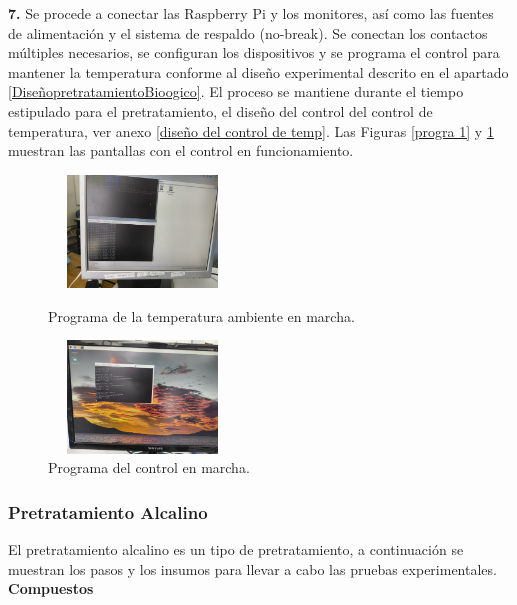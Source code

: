\documentclass[12pt]{article}
\begin{document}
			
			\textbf{7. } Se procede a conectar las Raspberry Pi y los monitores, así como las fuentes de alimentación y el sistema de respaldo (no-break). Se conectan los contactos múltiples necesarios, se configuran los dispositivos y se programa el control para mantener la temperatura conforme al diseño experimental descrito en el apartado \ref{DiseñopretratamientoBioogico}. El proceso se mantiene durante el tiempo estipulado para el pretratamiento, el diseño del control del control de temperatura, ver anexo \ref{diseño del control de temp}. Las Figuras \ref{progra 1} y \ref{progra 2} muestran las pantallas con el control en funcionamiento.
			
			\begin{figure}[H]
				\centering
				\begin{minipage}{0.46\textwidth}
					\centering
					\includegraphics[width=5cm, height=3cm]{imagenes/programa1} %
					\caption{Programa de la temperatura ambiente en marcha.}
					\label{progra 1}
				\end{minipage}
				\hfill
				\begin{minipage}{0.48\textwidth}
					\centering
					\includegraphics[width=5cm, height=3cm]{imagenes/programa2} %
					\caption{Programa del control en marcha.}
					\label{progra 2}
				\end{minipage}
			\end{figure}
			

			
			
			\subsubsection{Pretratamiento Alcalino}
			El pretratamiento alcalino es un tipo de pretratamiento, a continuación se muestran los pasos y los insumos para llevar a cabo las pruebas experimentales.		
			\\[1 em]
			\textbf{Compuestos} 
			\\[0.5em]
			
\end{document}
